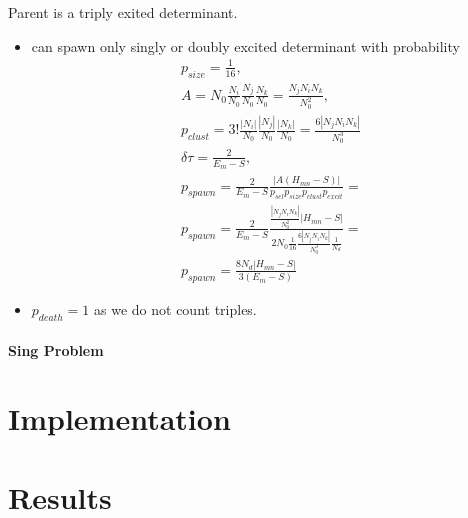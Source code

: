 \documentclass[twoside,english]{uiofysmaster}
\theoremstyle{definition}
\begin{document}
\begin{enumerate}
Parent is a triply exited determinant.
\begin{itemize}
	\item can spawn only singly or doubly excited determinant with  probability  
\begin{align}
	p_{size} = \frac{1}{16},\\
	A = N_0\frac{N_i}{N_0}\frac{N_j}{N_0}\frac{N_k}{N_0}=\frac{N_jN_iN_k}{N_0^2},\\
	p_{clust}=3!\frac{|N_i|}{N_0}\frac{|N_j|}{N_0}\frac{|N_k|}{N_0}=\frac{6|N_jN_iN_k|}{N_0^3}\\
	\delta \tau = \frac{2}{E_m  - S},\\
	p_{spawn} = \frac{2}{E_m - S} \frac{|A(H_{mn}-S)|}{ p_{sel}  p_{size} p_{clust} p_{excit}  }=\\
	p_{spawn} = \frac{2}{E_m - S} \frac{\frac{|N_jN_iN_k|}{N_0^2}|H_{mn}-S|}{ 2N_0 \frac{1}{16} \frac{6|N_jN_iN_k|}{N_0^3} \frac{1}{N_d}}= \\
p_{spawn} = \frac{8N_d|H_{mn}-S|}{3(E_m - S)}
\end{align}
	\item $p_{death} = 1$ as we do not count triples.
\end{itemize}
\end{enumerate}
\subsection{Sing Problem}

\part{Implementation}

\part{Results}



\printbibliography
\end{document}
